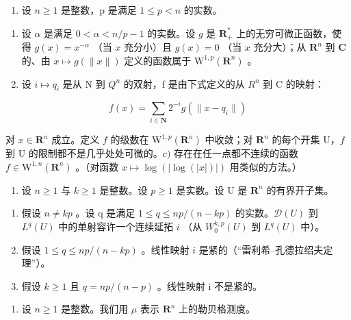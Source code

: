 \begin{enumerate}
\def\labelenumi{\arabic{enumi})}
\setcounter{enumi}{14}
\tightlist
\item
  设 \(n \geqslant 1\) 是整数，p 是满足 \(1 \leqslant p < n\) 的实数。
\end{enumerate}

\begin{enumerate}
\def\labelenumi{\alph{enumi})}
\item
  设 \(\alpha\) 是满足 \(0 < \alpha < n/p - 1\) 的实数。设 \(g\) 是 \(\mathbf{R}_{+}^{*}\) 上的无穷可微正函数，使得 \(g(x) = x^{-\alpha}\) （当 \(x\) 充分小）且 \(g(x) = 0\) （当 \(x\) 充分大）；从 \(\mathbf{R}^{n}\) 到 \(\mathbf{C}\) 的、由 \(x \mapsto g(\|x\|)\) 定义的函数属于 \(\mathrm{W}^{1,p}(\mathbf{R}^{n})\) 。
\item
  设 \(i \mapsto q_{i}\) 是从 N 到 \(Q^{n}\) 的双射，f 是由下式定义的从 \(R^{n}\) 到 C 的映射：
\end{enumerate}

\[
f (x) = \sum_ {i \in \mathbf {N}} 2 ^ {- i} g (\| x - q _ {i} \|)
\]

对 \(x \in \mathbf{R}^n\) 成立。定义 \(f\) 的级数在 \(\mathrm{W}^{1,p}(\mathbf{R}^n)\) 中收敛；对 \(\mathbf{R}^n\) 的每个开集 U，\(f\) 到 U 的限制都不是几乎处处可微的。\(c)\) 存在在任一点都不连续的函数 \(f \in \mathrm{W}^{1,n}(\mathbf{R}^n)\) 。（对函数 \(x \mapsto \log(|\log(|x|)|)\) 用类似的方法。）

\begin{enumerate}
\def\labelenumi{\arabic{enumi})}
\setcounter{enumi}{15}
\tightlist
\item
  设 \(n \geqslant 1\) 与 \(k \geqslant 1\) 是整数。设 \(p \geqslant 1\) 是实数。设 U 是 \(\mathbf{R}^n\) 的有界开子集。
\end{enumerate}

\begin{enumerate}
\def\labelenumi{\alph{enumi})}
\item
  假设 \(n \neq kp\) 。设 q 是满足 \(1 \leqslant q \leqslant np/(n-kp)\) 的实数。\(\mathcal{D}(U)\) 到 \(L^{q}(U)\) 中的单射容许一个连续延拓 \(i\) （从 \(W_{0}^{k,p}(U)\) 到 \(L^{q}(U)\) 中）。
\item
  假设 \(1 \leqslant q \leqslant np/(n-kp)\) 。线性映射 \(i\) 是紧的（“雷利希–孔德拉绍夫定理”）。
\item
  假设 \(k \geqslant 1\) 且 \(q = np/(n - p)\) 。线性映射 i 不是紧的。
\end{enumerate}

\begin{enumerate}
\def\labelenumi{\arabic{enumi})}
\setcounter{enumi}{16}
\tightlist
\item
  设 \(n \geqslant 1\) 是整数。我们用 \(\mu\) 表示 \(\mathbf{R}^n\) 上的勒贝格测度。
\end{enumerate}

